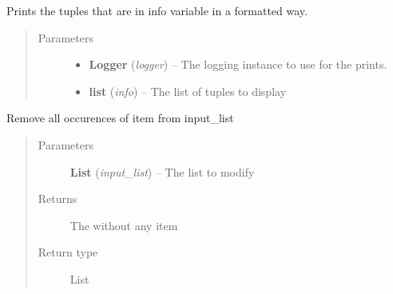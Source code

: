 \documentclass[a4paper,10pt,english]{sphinxmanual}
\begin{document}
\begin{fulllineitems}
\label{commands/apidoc/src:src.__init__.print_info}
Prints the tuples that are in info variable in a formatted way.
\begin{quote}\begin{description}
\item[{Parameters}] \leavevmode\begin{itemize}
\item {} 
\textbf{Logger} (\emph{logger}) -- The logging instance to use for the prints.

\item {} 
\textbf{list} (\emph{info}) -- The list of tuples to display

\end{itemize}

\end{description}\end{quote}

\end{fulllineitems}


\begin{fulllineitems}
\label{commands/apidoc/src:src.__init__.read_config_from_a_file}
\end{fulllineitems}


\begin{fulllineitems}
\label{commands/apidoc/src:src.__init__.remove_item_from_list}
Remove all occurences of item from input\_list
\begin{quote}\begin{description}
\item[{Parameters}] \leavevmode
\textbf{List} (\emph{input\_list}) -- The list to modify

\item[{Returns}] \leavevmode
The without any item

\item[{Return type}] \leavevmode
List

\end{description}\end{quote}

\end{fulllineitems}
\end{document}
